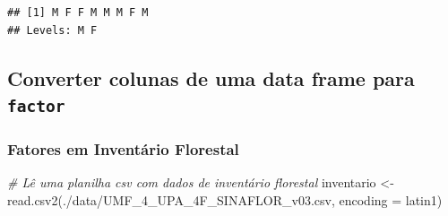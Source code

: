 \documentclass[
]{article}
\newenvironment{Shaded}{\begin{snugshade}}{\end{snugshade}}
\newcommand{\AttributeTok}[1]{\textcolor[rgb]{0.77,0.63,0.00}{#1}}
\newcommand{\CommentTok}[1]{\textcolor[rgb]{0.56,0.35,0.01}{\textit{#1}}}
\newcommand{\ConstantTok}[1]{\textcolor[rgb]{0.00,0.00,0.00}{#1}}
\newcommand{\DecValTok}[1]{\textcolor[rgb]{0.00,0.00,0.81}{#1}}
\newcommand{\FunctionTok}[1]{\textcolor[rgb]{0.00,0.00,0.00}{#1}}
\newcommand{\NormalTok}[1]{#1}
\newcommand{\OtherTok}[1]{\textcolor[rgb]{0.56,0.35,0.01}{#1}}
\newcommand{\SpecialCharTok}[1]{\textcolor[rgb]{0.00,0.00,0.00}{#1}}
\newcommand{\StringTok}[1]{\textcolor[rgb]{0.31,0.60,0.02}{#1}}
\begin{document}
\begin{verbatim}
## [1] M F F M M M F M
## Levels: M F
\end{verbatim}

\hypertarget{converter-colunas-de-uma-data-frame-para-factor}{%
\subsection{\texorpdfstring{Converter colunas de uma data frame para
\texttt{factor}}{Converter colunas de uma data frame para factor}}\label{converter-colunas-de-uma-data-frame-para-factor}}

\hypertarget{fatores-em-inventuxe1rio-florestal}{%
\subsubsection{Fatores em Inventário
Florestal}\label{fatores-em-inventuxe1rio-florestal}}

\begin{Shaded}
\begin{Highlighting}[]
\CommentTok{\# Lê uma planilha csv com dados de inventário florestal}
\NormalTok{inventario }\OtherTok{\textless{}{-}} \FunctionTok{read.csv2}\NormalTok{(}\StringTok{\textquotesingle{}./data/UMF\_4\_UPA\_4F\_SINAFLOR\_v03.csv\textquotesingle{}}\NormalTok{,}
                \AttributeTok{encoding =} \StringTok{\textquotesingle{}latin1\textquotesingle{}}\NormalTok{)}
\end{Highlighting}
\end{Shaded}

\begin{Shaded}
\end{Shaded}

\begin{Shaded}
\end{Shaded}
\end{document}
